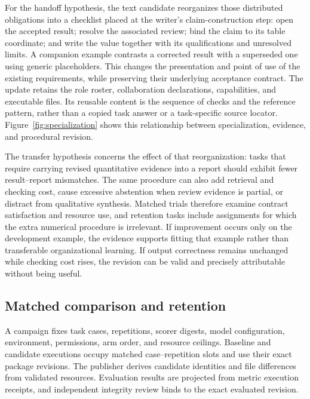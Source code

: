 For the handoff hypothesis, the text candidate reorganizes those distributed obligations into a checklist placed at the writer's claim-construction step: open the accepted result; resolve the associated review; bind the claim to its table coordinate; and write the value together with its qualifications and unresolved limits. A companion example contrasts a corrected result with a superseded one using generic placeholders. This changes the presentation and point of use of the existing requirements, while preserving their underlying acceptance contract. The update retains the role roster, collaboration declarations, capabilities, and executable files. Its reusable content is the sequence of checks and the reference pattern, rather than a copied task answer or a task-specific source locator. Figure~\ref{fig:specialization} shows this relationship between specialization, evidence, and procedural revision.

The transfer hypothesis concerns the effect of that reorganization: tasks that require carrying revised quantitative evidence into a report should exhibit fewer result--report mismatches. The same procedure can also add retrieval and checking cost, cause excessive abstention when review evidence is partial, or distract from qualitative synthesis. Matched trials therefore examine contract satisfaction and resource use, and retention tasks include assignments for which the extra numerical procedure is irrelevant. If improvement occurs only on the development example, the evidence supports fitting that example rather than transferable organizational learning. If output correctness remains unchanged while checking cost rises, the revision can be valid and precisely attributable without being useful.



\subsection{Matched comparison and retention}
A campaign fixes task cases, repetitions, scorer digests, model configuration, environment, permissions, arm order, and resource ceilings. Baseline and candidate executions occupy matched case--repetition slots and use their exact package revisions. The publisher derives candidate identities and file differences from validated resources. Evaluation results are projected from metric execution receipts, and independent integrity review binds to the exact evaluated revision.

